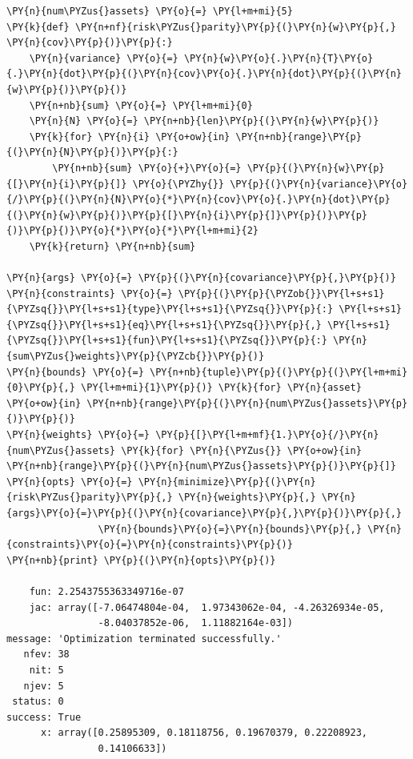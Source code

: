 \begin{tcolorbox}[breakable, size=fbox, boxrule=1pt, pad at break*=1mm,colback=cellbackground, colframe=cellborder]
\begin{Verbatim}[commandchars=\\\{\}]
\PY{n}{num\PYZus{}assets} \PY{o}{=} \PY{l+m+mi}{5}
\PY{k}{def} \PY{n+nf}{risk\PYZus{}parity}\PY{p}{(}\PY{n}{w}\PY{p}{,} \PY{n}{cov}\PY{p}{)}\PY{p}{:}
    \PY{n}{variance} \PY{o}{=} \PY{n}{w}\PY{o}{.}\PY{n}{T}\PY{o}{.}\PY{n}{dot}\PY{p}{(}\PY{n}{cov}\PY{o}{.}\PY{n}{dot}\PY{p}{(}\PY{n}{w}\PY{p}{)}\PY{p}{)} 
    \PY{n+nb}{sum} \PY{o}{=} \PY{l+m+mi}{0}
    \PY{n}{N} \PY{o}{=} \PY{n+nb}{len}\PY{p}{(}\PY{n}{w}\PY{p}{)}
    \PY{k}{for} \PY{n}{i} \PY{o+ow}{in} \PY{n+nb}{range}\PY{p}{(}\PY{n}{N}\PY{p}{)}\PY{p}{:}
        \PY{n+nb}{sum} \PY{o}{+}\PY{o}{=} \PY{p}{(}\PY{n}{w}\PY{p}{[}\PY{n}{i}\PY{p}{]} \PY{o}{\PYZhy{}} \PY{p}{(}\PY{n}{variance}\PY{o}{/}\PY{p}{(}\PY{n}{N}\PY{o}{*}\PY{n}{cov}\PY{o}{.}\PY{n}{dot}\PY{p}{(}\PY{n}{w}\PY{p}{)}\PY{p}{[}\PY{n}{i}\PY{p}{]}\PY{p}{)}\PY{p}{)}\PY{p}{)}\PY{o}{*}\PY{o}{*}\PY{l+m+mi}{2} 
    \PY{k}{return} \PY{n+nb}{sum}
		
\PY{n}{args} \PY{o}{=} \PY{p}{(}\PY{n}{covariance}\PY{p}{,}\PY{p}{)}
\PY{n}{constraints} \PY{o}{=} \PY{p}{(}\PY{p}{\PYZob{}}\PY{l+s+s1}{\PYZsq{}}\PY{l+s+s1}{type}\PY{l+s+s1}{\PYZsq{}}\PY{p}{:} \PY{l+s+s1}{\PYZsq{}}\PY{l+s+s1}{eq}\PY{l+s+s1}{\PYZsq{}}\PY{p}{,} \PY{l+s+s1}{\PYZsq{}}\PY{l+s+s1}{fun}\PY{l+s+s1}{\PYZsq{}}\PY{p}{:} \PY{n}{sum\PYZus{}weights}\PY{p}{\PYZcb{}}\PY{p}{)} 
\PY{n}{bounds} \PY{o}{=} \PY{n+nb}{tuple}\PY{p}{(}\PY{p}{(}\PY{l+m+mi}{0}\PY{p}{,} \PY{l+m+mi}{1}\PY{p}{)} \PY{k}{for} \PY{n}{asset} \PY{o+ow}{in} \PY{n+nb}{range}\PY{p}{(}\PY{n}{num\PYZus{}assets}\PY{p}{)}\PY{p}{)}
\PY{n}{weights} \PY{o}{=} \PY{p}{[}\PY{l+m+mf}{1.}\PY{o}{/}\PY{n}{num\PYZus{}assets} \PY{k}{for} \PY{n}{\PYZus{}} \PY{o+ow}{in} \PY{n+nb}{range}\PY{p}{(}\PY{n}{num\PYZus{}assets}\PY{p}{)}\PY{p}{]}
\PY{n}{opts} \PY{o}{=} \PY{n}{minimize}\PY{p}{(}\PY{n}{risk\PYZus{}parity}\PY{p}{,} \PY{n}{weights}\PY{p}{,} \PY{n}{args}\PY{o}{=}\PY{p}{(}\PY{n}{covariance}\PY{p}{,}\PY{p}{)}\PY{p}{,}
                \PY{n}{bounds}\PY{o}{=}\PY{n}{bounds}\PY{p}{,} \PY{n}{constraints}\PY{o}{=}\PY{n}{constraints}\PY{p}{)}
\PY{n+nb}{print} \PY{p}{(}\PY{n}{opts}\PY{p}{)}

    fun: 2.2543755363349716e-07
    jac: array([-7.06474804e-04,  1.97343062e-04, -4.26326934e-05,
                -8.04037852e-06,  1.11882164e-03])
message: 'Optimization terminated successfully.'
   nfev: 38
    nit: 5 
   njev: 5
 status: 0
success: True
      x: array([0.25895309, 0.18118756, 0.19670379, 0.22208923, 
                0.14106633])


\end{Verbatim}
\end{tcolorbox}
